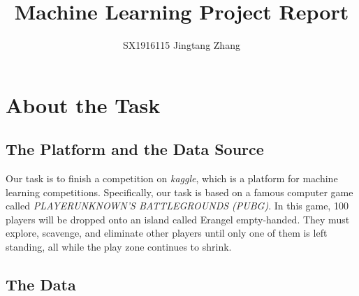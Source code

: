 \documentclass[journal=jacsat,manuscript=article]{achemso}
\author{SX1916115 Jingtang Zhang}
\affiliation[NUAA]
{CCST, NUAA, Nanjing, China}
\title[An \textsf{achemso} demo]
  {Machine Learning Project Report}
\begin{document}


\section{About the Task}

\subsection{The Platform and the Data Source}

Our task is to finish a competition on \emph{kaggle}, which is a platform
for machine learning competitions. Specifically, our task is based on a
famous computer game called \emph{PLAYERUNKNOWN’S BATTLEGROUNDS (PUBG)}.
In this game, 100 players will be dropped onto an island called Erangel
empty-handed. They must explore, scavenge, and eliminate other players until
only one of them is left standing, all while the play zone continues to
shrink.

\subsection{The Data}
\end{document}
